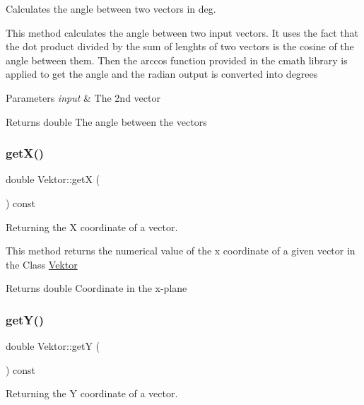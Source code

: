 Calculates the angle between two vectors in deg. 

This method calculates the angle between two input vectors. It uses the fact that the dot product divided by the sum of lenghts of two vectors is the cosine of the angle between them. Then the arccos function provided in the cmath library is applied to get the angle and the radian output is converted into degrees


\begin{DoxyParams}{Parameters}
{\em input} & The 2nd vector \\
\hline
\end{DoxyParams}
\begin{DoxyReturn}{Returns}
double The angle between the vectors 
\end{DoxyReturn}
\mbox{\label{class_vektor_ad1864a78b96956dc7f504bba9b39af45}} 
\subsubsection{\texorpdfstring{get\+X()}{getX()}}
{\footnotesize\ttfamily double Vektor\+::getX (\begin{DoxyParamCaption}{ }\end{DoxyParamCaption}) const}



Returning the X coordinate of a vector. 

This method returns the numerical value of the x coordinate of a given vector in the Class \hyperlink{class_vektor}{Vektor}

\begin{DoxyReturn}{Returns}
double Coordinate in the x-\/plane 
\end{DoxyReturn}
\mbox{\label{class_vektor_a93d6584667064c7e3abc9d42b529db93}} 
\subsubsection{\texorpdfstring{get\+Y()}{getY()}}
{\footnotesize\ttfamily double Vektor\+::getY (\begin{DoxyParamCaption}{ }\end{DoxyParamCaption}) const}



Returning the Y coordinate of a vector. 

